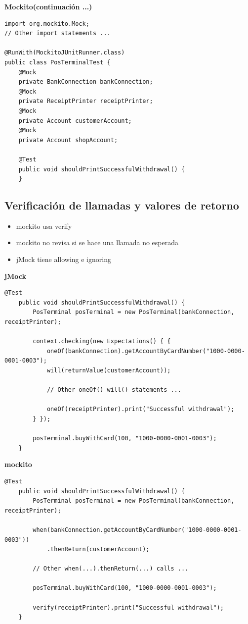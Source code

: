 \documentclass[]{beamer}
\begin{document}
\begin{frame}[fragile]
\textbf{Mockito(continuación ...)}
\begin{verbatim}
import org.mockito.Mock;
// Other import statements ...

@RunWith(MockitoJUnitRunner.class)
public class PosTerminalTest {
    @Mock
    private BankConnection bankConnection;
    @Mock
    private ReceiptPrinter receiptPrinter;
    @Mock
    private Account customerAccount;
    @Mock
    private Account shopAccount;

    @Test
    public void shouldPrintSuccessfulWithdrawal() {
    }
\end{verbatim}
\end{frame}

\subsection{Verificación de llamadas y valores de retorno}
\begin{frame}
  \begin{itemize}
    \item mockito usa verify
    \item mockito no revisa si se hace una llamada no esperada
    \item jMock tiene allowing e ignoring
  \end{itemize}
\end{frame}

\begin{frame}[fragile]
\textbf{jMock}
\begin{verbatim}
@Test
    public void shouldPrintSuccessfulWithdrawal() {
        PosTerminal posTerminal = new PosTerminal(bankConnection, receiptPrinter);

        context.checking(new Expectations() { {
            oneOf(bankConnection).getAccountByCardNumber("1000-0000-0001-0003");
            will(returnValue(customerAccount));

            // Other oneOf() will() statements ...

            oneOf(receiptPrinter).print("Successful withdrawal");
        } });

        posTerminal.buyWithCard(100, "1000-0000-0001-0003");
    }
\end{verbatim}
\textbf{mockito}
\begin{verbatim}
@Test
    public void shouldPrintSuccessfulWithdrawal() {
        PosTerminal posTerminal = new PosTerminal(bankConnection, receiptPrinter);

        when(bankConnection.getAccountByCardNumber("1000-0000-0001-0003"))
            .thenReturn(customerAccount);

        // Other when(...).thenReturn(...) calls ...

        posTerminal.buyWithCard(100, "1000-0000-0001-0003");

        verify(receiptPrinter).print("Successful withdrawal");
    }
\end{verbatim}
\end{frame}
\end{document}
